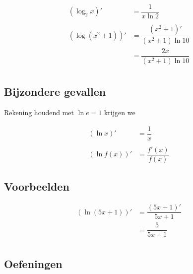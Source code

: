 \documentclass[12pt]{article}
\begin{document}
\begin{align*}
\left(\log_2 x\right)' &= \dfrac{1}{x\ln 2}\\\\
\left(\log(x^2+1)\right)' &= \dfrac{(x^2+1)'}{(x^2+1)\ln 10}\\
                           &= \dfrac{2x}{(x^2+1)\ln 10}\\
\end{align*}

\subsection{Bijzondere gevallen}

Rekening houdend met $\ln e = 1$ krijgen we

\begin{align*}
  (\ln x)' &= \dfrac{1}{x}\\\\
  (\ln f(x))' &= \dfrac{f'(x)}{f(x)} 
\end{align*}

\subsection{Voorbeelden}

\begin{align*}
\left(\ln(5x+1)\right)' &= \dfrac{(5x+1)'}{5x+1}\\
                        &= \dfrac{5}{5x+1}\\
\end{align*}

\subsection{Oefeningen}
\end{document}
